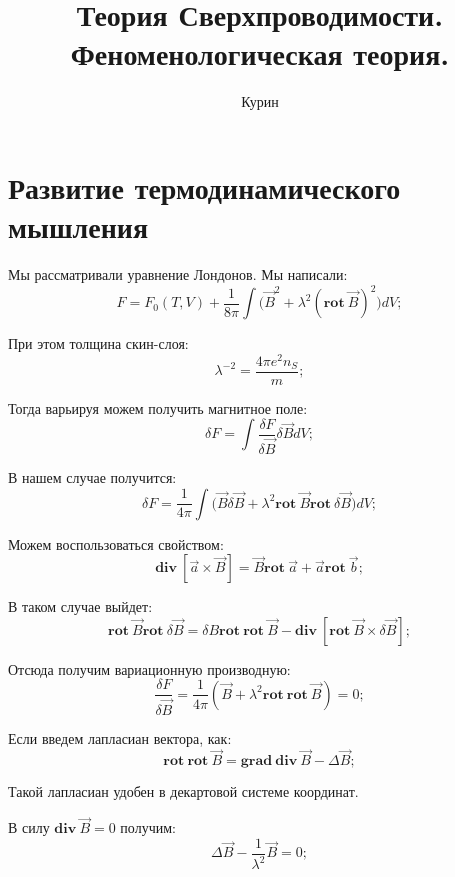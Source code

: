 \documentclass[a4paper, 14pt, russian]{article}
\title{Теория Сверхпроводимости. Феноменологическая теория.}
\author{Курин}
\date{}
\newcommand{\be}{\begin{equation}}
\newcommand{\ee}{\end{equation}}
\newcommand{\rot}{\textbf{rot}~}
\renewcommand{\div}{\textbf{div}~}
\renewcommand{\grad}{\textbf{grad}~}
\begin{document}
	\maketitle

	\section{Развитие термодинамического мышления}

	Мы рассматривали уравнение Лондонов. Мы написали:
	\be
		F = F_0(T,V) + \frac{1}{8\pi} \int \big(\vec{B}^2 + \lambda^2 (\rot \vec B)^2\big)dV;
	\ee

	При этом толщина скин-слоя:
	\be
		\lambda^{-2} = \frac{4\pi e^2 n_S}{m};
	\ee

	Тогда варьируя можем получить магнитное поле:
	\be
		\delta F = \int \frac{\delta F}{\delta \vec B} \delta \vec B dV;
	\ee

	В нашем случае получится:
	\be
		\delta F = \frac{1}{4\pi} \int \big(\vec B \delta \vec B + 
			\lambda^2 \rot \vec B \rot \delta \vec B\big) dV;
	\ee

	Можем воспользоваться свойством:
	\be
		\div [\vec a \times \vec B] = \vec B \rot \vec a + \vec a \rot \vec b;
	\ee

	В таком случае выйдет:
	\be
		\rot \vec B \rot \delta \vec B  = \delta B \rot \rot \vec B 
			- \div [\rot \vec B \times \delta \vec B ];
	\ee

	Отсюда получим вариационную производную:
	\be
		\frac{\delta F}{\delta \vec B} = \frac{1}{4\pi} 
			(\vec B + \lambda^2 \rot \rot \vec B) = 0;
	\ee

	Если введем лапласиан вектора, как:
	\be
				\rot \rot \vec B = \grad \div \vec B - \Delta \vec B;
			\ee

			Такой лапласиан удобен в декартовой системе координат.

			В силу $\div \vec B  = 0$ получим:
			\be
				\Delta \vec B - \frac{1}{\lambda^2} \vec B = 0;
			\ee
\end{document}
